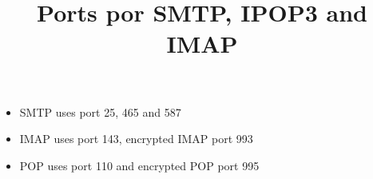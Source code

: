 \documentclass[12pt,journal]{journal}
\begin{document}
\title{Ports por SMTP, IPOP3 and IMAP}

\onecolumn

\maketitle


\begin{itemize}

\item SMTP uses port 25, 465 and 587

\item IMAP uses port 143, encrypted IMAP port 993

\item POP uses port 110 and encrypted POP port 995

\end{itemize}



 
\end{document}
